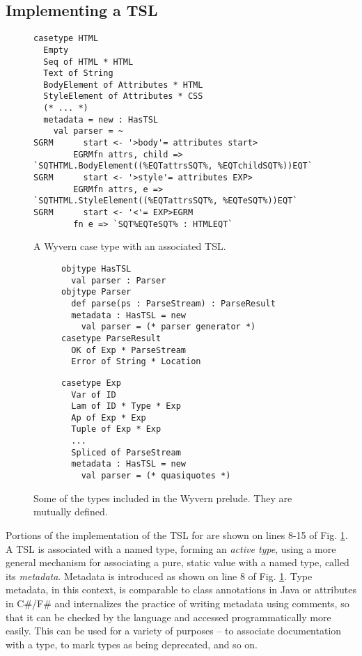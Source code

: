 \subsection{Implementing a TSL}
\begin{figure}
\begin{lstlisting}[escapechar=$]
casetype HTML 
  Empty
  Seq of HTML * HTML 
  Text of String
  BodyElement of Attributes * HTML
  StyleElement of Attributes * CSS
  (* ... *)
  metadata = new : HasTSL
    val parser = ~
SGRM      start <- '>body'= attributes start>
        EGRMfn attrs, child => `SQTHTML.BodyElement((%EQTattrsSQT%, %EQTchildSQT%))EQT`
SGRM      start <- '>style'= attributes EXP>
        EGRMfn attrs, e => `SQTHTML.StyleElement((%EQTattrsSQT%, %EQTeSQT%))EQT`
SGRM      start <- '<'= EXP>EGRM 
        fn e => `SQT%EQTeSQT% : HTMLEQT`
\end{lstlisting}
\vspace{-8px}
\caption{A Wyvern case type with an associated TSL.}
\label{f-htmltype}
\end{figure}
\begin{figure}[t]
\begin{subfigure}[t]{.58\textwidth}
\begin{lstlisting}
objtype HasTSL
  val parser : Parser
objtype Parser                          
  def parse(ps : ParseStream) : ParseResult
  metadata : HasTSL = new
    val parser = (* parser generator *)
casetype ParseResult
  OK of Exp * ParseStream
  Error of String * Location  
\end{lstlisting}
\end{subfigure}
\begin{subfigure}[t]{.42\textwidth}
\begin{lstlisting}[linewidth=.42\textwidth,firstnumber=10]
casetype Exp 
  Var of ID
  Lam of ID * Type * Exp
  Ap of Exp * Exp
  Tuple of Exp * Exp
  ... 
  Spliced of ParseStream
  metadata : HasTSL = new
    val parser = (* quasiquotes *)
\end{lstlisting}
\end{subfigure}
\caption{Some of the types included in the Wyvern prelude. They are mutually defined.}
\label{f-builtins}
\end{figure}
Portions of the implementation of the TSL for  are shown on lines 8-15 of Fig. \ref{f-htmltype}. A TSL is associated with a named type, forming an \emph{active type}, using a more general mechanism for associating a pure, static value with a named type, called its \emph{metadata}. Metadata is introduced as shown on line 8 of Fig. \ref{f-htmltype}. Type metadata, in this context, is comparable to class annotations in Java or attributes in C\#/F\# and internalizes the practice of writing metadata using comments, so that it can be checked by the language and accessed programmatically more easily. This can be used for a variety of purposes -- to associate documentation with a type, to mark types as being deprecated, and so on.

